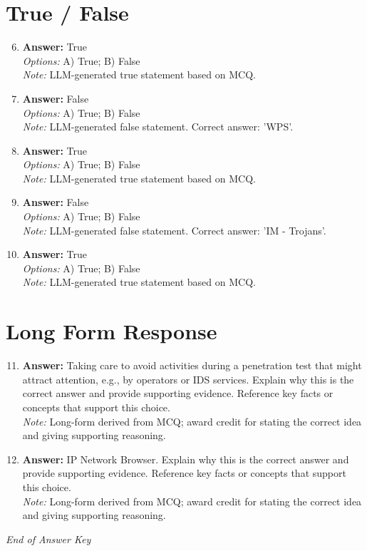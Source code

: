 \documentclass[12pt]{article}
\begin{document}
\section*{True / False}
\begin{enumerate}[label=\arabic*.]
\setcounter{enumi}{5}
\item \textbf{Answer:} True
\\ \textit{Options:} A) True; B) False
\\ \textit{Note:} LLM-generated true statement based on MCQ.
\item \textbf{Answer:} False
\\ \textit{Options:} A) True; B) False
\\ \textit{Note:} LLM-generated false statement. Correct answer: 'WPS'.
\item \textbf{Answer:} True
\\ \textit{Options:} A) True; B) False
\\ \textit{Note:} LLM-generated true statement based on MCQ.
\item \textbf{Answer:} False
\\ \textit{Options:} A) True; B) False
\\ \textit{Note:} LLM-generated false statement. Correct answer: 'IM - Trojans'.
\item \textbf{Answer:} True
\\ \textit{Options:} A) True; B) False
\\ \textit{Note:} LLM-generated true statement based on MCQ.
\end{enumerate}

\section*{Long Form Response}
\begin{enumerate}[label=\arabic*.]
\setcounter{enumi}{10}
\item \textbf{Answer:} Taking care to avoid activities during a penetration test that might attract attention, e.g., by operators or IDS services. Explain why this is the correct answer and provide supporting evidence. Reference key facts or concepts that support this choice.
\\ \textit{Note:} Long-form derived from MCQ; award credit for stating the correct idea and giving supporting reasoning.
\item \textbf{Answer:} IP Network Browser. Explain why this is the correct answer and provide supporting evidence. Reference key facts or concepts that support this choice.
\\ \textit{Note:} Long-form derived from MCQ; award credit for stating the correct idea and giving supporting reasoning.
\end{enumerate}

\vfill
\noindent\textit{End of Answer Key}
\end{document}
